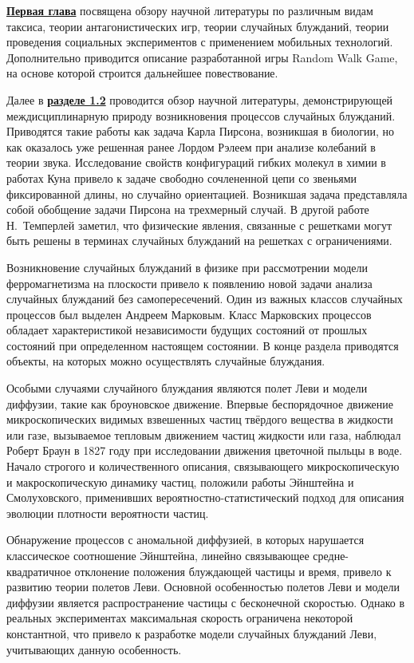 \underline{\textbf{Первая глава}} посвящена обзору научной литературы по различным видам таксиса, теории антагонистических игр, теории случайных блужданий, теории проведения социальных экспериментов с применением мобильных технологий. Дополнительно приводится описание разработанной игры Random Walk Game, на основе которой строится дальнейшее повествование.


Далее в \underline{\textbf{разделе 1.2}} проводится обзор научной литературы, демонстрирующей междисциплинарную природу возникновения процессов случайных блужданий. Приводятся такие работы как задача Карла Пирсона, возникшая в биологии, но как оказалось уже решенная ранее Лордом Рэлеем при анализе колебаний в теории звука. Исследование свойств конфигураций гибких молекул в химии в работах Куна привело к задаче свободно сочлененной цепи со звеньями фиксированной длины, но случайно ориентацией. Возникшая задача представляла собой обобщение задачи Пирсона на  трехмерный случай. В другой работе Н.~Темперлей заметил, что физические явления, связанные с решетками могут быть решены в терминах случайных блужданий на решетках с ограничениями.

Возникновение случайных блужданий в физике при рассмотрении модели ферромагнетизма на плоскости привело к появлению  новой задачи анализа случайных блужданий без самопересечений. Один из важных классов случайных процессов был выделен Андреем Марковым. Класс Марковских процессов обладает характеристикой независимости будущих состояний от прошлых состояний при определенном настоящем состоянии. В конце раздела приводятся объекты, на которых можно осуществлять случайные блуждания.

Особыми случаями случайного блуждания являются полет Леви и модели диффузии, такие как броуновское движение. Впервые беспорядочное движение микроскопических видимых взвешенных частиц твёрдого вещества в жидкости или газе, вызываемое тепловым движением частиц жидкости или газа, наблюдал Роберт Браун в 1827 году при исследовании движения цветочной пыльцы в воде. Начало строгого и количественного описания, связывающего микроскопическую и макроскопическую динамику частиц, положили работы Эйнштейна и Смолуховского, применивших вероятностно-статистический подход для описания эволюции плотности вероятности частиц.

Обнаружение процессов с аномальной диффузией, в которых нарушается классическое соотношение Эйнштейна, линейно связывающее средне-квадратичное отклонение положения блуждающей частицы и время, привело к развитию теории полетов Леви. Основной особенностью полетов Леви и модели диффузии является распространение частицы с бесконечной скоростью. Однако в реальных экспериментах максимальная скорость ограничена некоторой константной, что привело к разработке модели случайных блужданий Леви, учитывающих данную особенность.

